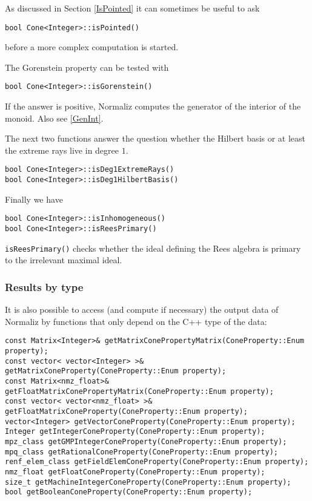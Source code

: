 \documentclass[12pt,a4paper]{scrartcl}
\theoremstyle{definition}
\begin{document}
\begin{small}
As discussed in Section \ref{IsPointed} it can sometimes be useful to ask
\begin{Verbatim}
bool Cone<Integer>::isPointed()
\end{Verbatim}
before a more complex computation is started.

The Gorenstein property can be tested with
\begin{Verbatim}
bool Cone<Integer>::isGorenstein()
\end{Verbatim}
If the answer is positive, Normaliz computes the generator of the interior of the monoid. Also see \ref{GenInt}.


The next two functions answer the question whether the Hilbert basis or at least the extreme rays live in degree $1$.
\begin{Verbatim}
bool Cone<Integer>::isDeg1ExtremeRays()
bool Cone<Integer>::isDeg1HilbertBasis()
\end{Verbatim}

Finally we have
\begin{Verbatim}
bool Cone<Integer>::isInhomogeneous()
bool Cone<Integer>::isReesPrimary()
\end{Verbatim}
\verb|isReesPrimary()| checks whether the ideal defining the Rees algebra is primary to the irrelevant maximal ideal.


\subsubsection{Results by type}\label{ByType}

It is also possible to access (and compute if necessary) the output data of Normaliz by functions that only depend on the C++ type of the data:

\begin{Verbatim}
const Matrix<Integer>& getMatrixConePropertyMatrix(ConeProperty::Enum property);
const vector< vector<Integer> >& getMatrixConeProperty(ConeProperty::Enum property);    
const Matrix<nmz_float>& getFloatMatrixConePropertyMatrix(ConeProperty::Enum property);
const vector< vector<nmz_float> >& getFloatMatrixConeProperty(ConeProperty::Enum property);    
vector<Integer> getVectorConeProperty(ConeProperty::Enum property);    
Integer getIntegerConeProperty(ConeProperty::Enum property);    
mpz_class getGMPIntegerConeProperty(ConeProperty::Enum property);    
mpq_class getRationalConeProperty(ConeProperty::Enum property);
renf_elem_class getFieldElemConeProperty(ConeProperty::Enum property);   
nmz_float getFloatConeProperty(ConeProperty::Enum property);    
size_t getMachineIntegerConeProperty(ConeProperty::Enum property);    
bool getBooleanConeProperty(ConeProperty::Enum property);
\end{Verbatim}


\end{small}
\end{document}
